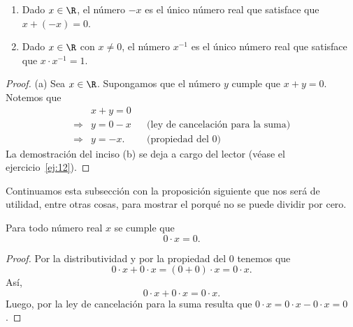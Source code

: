\documentclass[12pt,a4paper]{book}
\begin{document}
    \begin{proposicion}\label{prop:6}
        \begin{enumerate}
            \item Dado $x\in\R$, el número $-x$ es el único número real que satisface que
            $x+(-x)=0$.
            \item Dado $x\in\R$ con $x\neq 0$, el número $x^{-1}$ es el único número real que satisface
            que $x\cdot x^{-1}=1$.
        \end{enumerate}
    \end{proposicion}

    \begin{proof}
        (a) Sea $x\in\R$. Supongamos que el número $y$ cumple que
        $x+y=0$. Notemos que
        \begin{align*}
            &x+y=0\\
            \Rightarrow{}& y=0-x &&\text{(ley de cancelación para la suma)}\\
            \Rightarrow{}& y=-x. &&\text{(propiedad del $0$)}
        \end{align*}
        La demostración del inciso (b) se deja a cargo del lector (véase el ejercicio~\ref{ej:12}).
    \end{proof}

    Continuamos esta subsección con la proposición siguiente que nos será de
    utilidad, entre otras cosas, para mostrar el porqué no se puede dividir por
    cero.

    \begin{proposicion}\label{prop:7}
        Para todo número real $x$ se cumple que
        \begin{equation*}
            0\cdot x=0.
        \end{equation*}
    \end{proposicion}

    \begin{proof}
        Por la distributividad y por la propiedad del $0$ tenemos que
        \begin{equation*}
            0\cdot x+0\cdot x=(0+0)\cdot x=0\cdot x.
        \end{equation*}
        Así,
        \begin{equation*}
            0\cdot x+0\cdot x=0\cdot x.
        \end{equation*}
        Luego, por la ley de cancelación para la suma resulta que $0\cdot x=0\cdot x-0\cdot x=0$.
    \end{proof}
\end{document}
